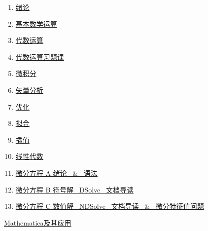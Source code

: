 \documentclass[11pt]{article}
\begin{document}
\begin{multicols}{2}
	\begin{enumerate}
		\item  \href{https://mp.weixin.qq.com/s/vYx6pka6K9ikLSgcRfzJtQ}{绪论} %
		\item  \href{https://mp.weixin.qq.com/s/MwU5AKH8KVgBctNnYlnkXw}{基本数学运算} %
		\item  \href{https://mp.weixin.qq.com/s/L95HcEuH4HCHBhKwBd6azg}{代数运算} %
		\item  \href{https://mp.weixin.qq.com/s/Z_VAuRKu2GN7hmFvptoFSg}{代数运算习题课} %
		\item  \href{https://mp.weixin.qq.com/s/BZ6Z5tSLeoT52d69By80Ow}{微积分} %
		\item  \href{https://mp.weixin.qq.com/s/ngAuravDc4KWF22gXzYegQ}{矢量分析} %
		\item  \href{https://mp.weixin.qq.com/s/w7A7OhPfpGvNMaLfajgYYQ}{优化} %
		\item  \href{https://mp.weixin.qq.com/s/e9Y7wM3-M40HoJc4hZMpvA}{拟合} %
		\item  \href{https://mp.weixin.qq.com/s/djpFqzcafvxSH7nXtyuF2w}{插值} %
		\item  \href{https://mp.weixin.qq.com/s/L7z4vrNeOKWhXAUEFLDTSw}{线性代数} %
		\item  \href{https://mp.weixin.qq.com/s/rL9oXhfXBXeXwoLLEmHuuA}{微分方程 A 绪论 \ \& \ 语法} %
		\item  \href{https://mp.weixin.qq.com/s/ixqqvCjuPC-EIJzgpS4h5w}{微分方程 B 符号解 \ DSolve \ 文档导读} %
		\item  \href{https://mp.weixin.qq.com/s/ruo4Sbxuj_YQYXSB_20J-A}{微分方程 C 数值解 \ NDSolve \ 文档导读 \ \& \ 微分特征值问题} %
	\end{enumerate}
\end{multicols}



\begin{center}
	{\large  \href{https://www.bilibili.com/video/BV1av411N7Xi/?spm_id_from=333.337.search-card.all.click}{\kaishu Mathematica及其应用}}
\end{center}

\vspace{-1cm}
\end{document}
